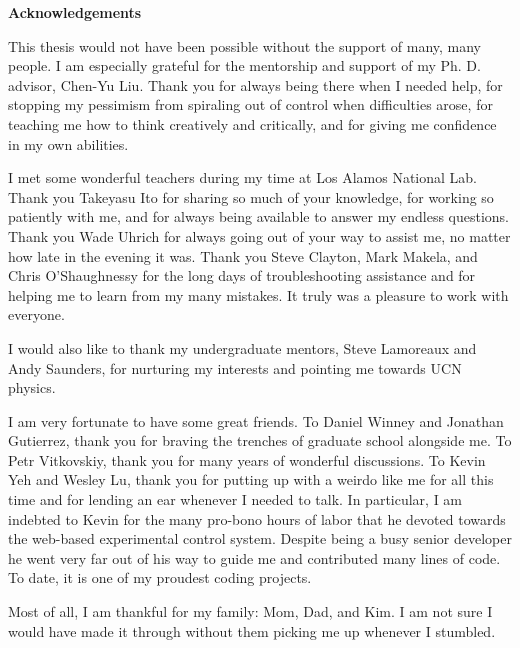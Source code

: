\begin{centering}
\textbf{Acknowledgements} \par
\vspace{\baselineskip}
\end{centering}


This thesis would not have been possible without the support of many, many people. I am especially grateful for the mentorship and support of my Ph. D. advisor, Chen-Yu Liu. Thank you for always being there when I needed help, for stopping my pessimism from spiraling out of control when difficulties arose, for teaching me how to think creatively and critically, and for giving me confidence in my own abilities.

I met some wonderful teachers during my time at Los Alamos National Lab. Thank you Takeyasu Ito for sharing so much of your knowledge, for working so patiently with me, and for always being available to answer my endless questions. Thank you Wade Uhrich for always going out of your way to assist me, no matter how late in the evening it was. Thank you Steve Clayton, Mark Makela, and Chris O'Shaughnessy for the long days of troubleshooting assistance and for helping me to learn from my many mistakes. It truly was a pleasure to work with everyone.

I would also like to thank my undergraduate mentors, Steve Lamoreaux and Andy Saunders, for nurturing my interests and pointing me towards UCN physics.

I am very fortunate to have some great friends. To Daniel Winney and Jonathan Gutierrez, thank you for braving the trenches of graduate school alongside me. To Petr Vitkovskiy, thank you for many years of wonderful discussions. To Kevin Yeh and Wesley Lu, thank you for putting up with a weirdo like me for all this time and for lending an ear whenever I needed to talk. In particular, I am indebted to Kevin for the many pro-bono hours of labor that he devoted towards the web-based experimental control system. Despite being a busy senior developer he went very far out of his way to guide me and contributed many lines of code. To date, it is one of my proudest coding projects.

Most of all, I am thankful for my family: Mom, Dad, and Kim. I am not sure I would have made it through without them picking me up whenever I stumbled.




